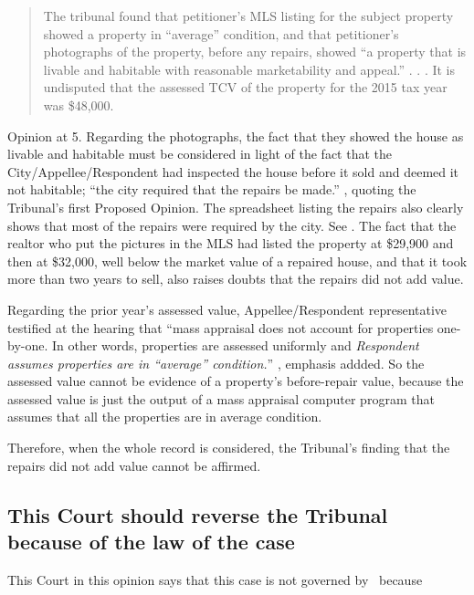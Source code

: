 \documentclass[12pt,\documentclassflag]{michiganCourtOfAppealsBrief}
\begin{document}
\begin{quote}
The tribunal found that
petitioner's MLS listing for the subject property showed a property in ``average'' condition, and
that petitioner's photographs of the property, before any repairs, showed ``a property that is livable
and habitable with reasonable marketability and appeal.'' . . .
It is undisputed that the assessed
TCV of the property for the 2015 tax year was \$48,000.
\end{quote}
Opinion at 5.
Regarding the photographs, the fact that they showed the house as livable and habitable must be considered in light of the fact that the City/Appellee/Respondent had inspected the house before it sold and deemed it not habitable; ``the city required that the repairs be made.'' , quoting the Tribunal's first Proposed Opinion. The spreadsheet listing the repairs also clearly shows that most of the repairs were required by the city. See \repairs[]. The fact that the realtor who put the pictures in the MLS had listed the property at \$29,900 and then at \$32,000, well below the market value of a repaired house, and that it took more than two years to sell, also raises doubts that the repairs did not add value.

Regarding the prior year's assessed value, Appellee/Respondent representative testified at the hearing that ``mass appraisal does not account for properties one-by-one. In other words, properties are assessed uniformly and \emph{Respondent assumes properties are in ``average'' condition.}'' \foj[4], emphasis addded. So the assessed value cannot be evidence of a property's before-repair value, because the assessed value is just the output of a mass appraisal computer program that assumes that all the properties are in average condition.

Therefore, when the whole record is considered, the Tribunal's finding that the repairs did not add value cannot be affirmed.

\subsection{This Court should reverse the Tribunal because of the law of the case}

This Court in this opinion says that this case is not governed by \cite[s]{Patru 1}\ because
\end{document}
